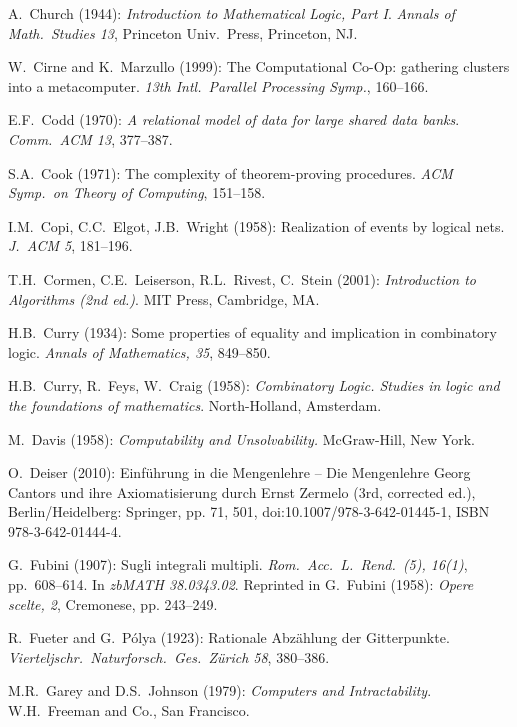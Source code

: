 \begin{thebibliography}{999}
A.~Church (1944):
{\it Introduction to Mathematical Logic, Part I}.
{\it Annals of Math.~Studies 13}, Princeton Univ.~Press, Princeton, NJ.

W.~Cirne and K.~Marzullo (1999): The Computational Co-Op: gathering
clusters into a metacomputer.  {\it 13th Intl.~Parallel Processing
Symp.}, 160--166.

E.F.~Codd (1970):  {\it A relational model of data for large shared
data banks}.  {\it Comm.~ACM 13}, 377--387.

S.A.~Cook (1971): The complexity of theorem-proving procedures.  {\it
ACM Symp.~on Theory of Computing}, 151--158.

I.M.~Copi, C.C.~Elgot, J.B.~Wright (1958): Realization of events by
logical nets.  {\it J.~ACM 5}, 181--196.

T.H.~Cormen, C.E.~Leiserson, R.L.~Rivest, C.~Stein (2001):
{\it Introduction to Algorithms (2nd ed.)}.
MIT Press, Cambridge, MA.

H.B.~Curry (1934): Some properties of equality and implication in
combinatory logic.  {\it Annals of Mathematics, 35}, 849--850.

H.B.~Curry, R.~Feys, W.~Craig (1958):
{\it Combinatory Logic.  Studies in logic and the foundations of
mathematics}.  North-Holland, Amsterdam.


M.~Davis (1958):
{\it Computability and Unsolvability.}
McGraw-Hill, New York.

O.~Deiser (2010): Einf\"{u}hrung in die Mengenlehre – Die Mengenlehre
Georg Cantors und ihre Axiomatisierung durch Ernst Zermelo (3rd,
corrected ed.), Berlin/Heidelberg: Springer, pp. 71, 501,
doi:10.1007/978-3-642-01445-1, ISBN 978-3-642-01444-4.




G.~Fubini (1907): Sugli integrali multipli.
{\it Rom.~Acc.~L.~Rend.~(5), 16(1)}, pp.~608–614.  In {\it zbMATH
  38.0343.02}.  Reprinted in
G.~Fubini (1958): {\it Opere scelte, 2}, Cremonese, pp. 243–249.

R.~Fueter and G.~P\'{o}lya (1923):
Rationale Abz\"{a}hlung der Gitterpunkte.  {\it
Vierteljschr.~Naturforsch.~Ges.~Z\"{u}rich 58}, 380--386.


M.R.~Garey and D.S.~Johnson (1979):
{\it Computers and Intractability}.
W.H.~Freeman and Co., San Francisco.


\end{thebibliography}
